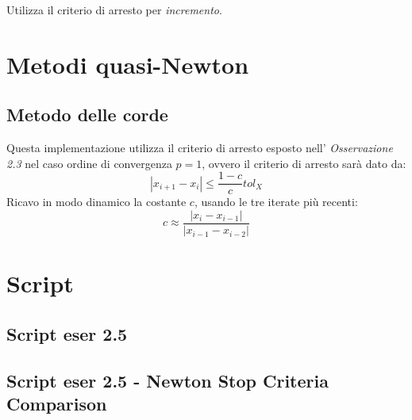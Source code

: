Utilizza il criterio di arresto per \emph{incremento}.


\section{Metodi quasi-Newton}
\subsection{Metodo delle corde}
\label{subsec:chordMethodLinearCriteria}
Questa implementazione utilizza il criterio di arresto esposto nell'
\emph{Osservazione 2.3} nel caso ordine di convergenza $p = 1$, ovvero il
criterio di arresto sar\`a dato da:
\begin{displaymath}
	|x_{i+1} - x_{i}| \leq \frac{1-c}{c}tol_{X}
\end{displaymath}
Ricavo in modo dinamico la costante $c$, usando le tre iterate pi\`u recenti:
\begin{displaymath}
	c \approx \frac{|x_{i} - x_{i-1}|}{|x_{i-1} - x_{i-2}|}
\end{displaymath}


\section{Script}
\subsection{Script eser 2.5}
\label{subsec:ScriptEser25}


\subsection{Script eser 2.5 - Newton Stop Criteria Comparison}
\label{subsec:ScriptEser25NewtonStopCriteriaComparison}

